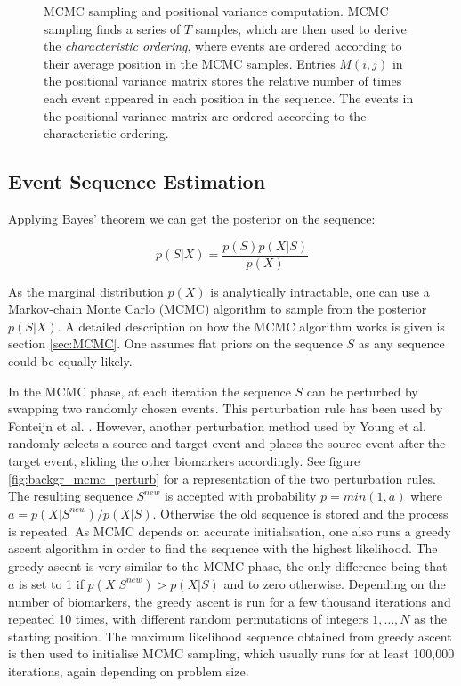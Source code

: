 \begin{figure}
\caption[Event-based model - MCMC sampling diagram]{MCMC sampling and positional variance computation. MCMC sampling finds a series of $T$ samples, which are then used to derive the \emph{characteristic ordering}, where events are ordered according to their average position in the MCMC samples. Entries $M(i,j)$ in the positional variance matrix stores the relative number of times each event appeared in each position in the sequence. The events in the positional variance matrix are ordered according to the characteristic ordering.}
\end{figure}


\subsection{Event Sequence Estimation}
\label{sec:model_est}

Applying Bayes' theorem  we can get the posterior on the sequence:

\begin{equation}
 p(S|X) = \frac{p(S)p(X|S)}{p(X)}
\end{equation}

As the marginal distribution $p(X)$ is analytically intractable, one can use a Markov-chain Monte Carlo (MCMC) algorithm to sample from the posterior $p(S|X)$. A detailed description on how the MCMC algorithm works is given is section \ref{sec:MCMC}. One assumes flat priors on the sequence $S$ as any sequence could be equally likely.

In the MCMC phase, at each iteration the sequence $S$ can be perturbed by swapping two randomly chosen events. This perturbation rule has been used by Fonteijn et al. \cite{fonteijn2012event}. However, another perturbation method used by Young et al. \cite{young2014data} randomly selects a source and target event and places the source event after the target event, sliding the other biomarkers accordingly. See figure \ref{fig:backgr_mcmc_perturb} for a representation of the two perturbation rules. The resulting sequence $S^{new}$ is accepted with probability $p = min(1, a)$ where $ a = p(X|S^{new})/p(X|S)$. Otherwise the old sequence is stored and the process is repeated. As MCMC depends on accurate initialisation, one also runs a greedy ascent algorithm in order to find the sequence with the highest likelihood. The greedy ascent is very similar to the MCMC phase, the only difference being that $a$ is set to 1 if $p(X|S^{new}) > p(X|S)$ and to zero otherwise. Depending on the number of biomarkers, the greedy ascent is run for a few thousand iterations and repeated 10 times, with different random permutations of integers $1,\dots,N$ as the starting position. The maximum likelihood sequence obtained from greedy ascent is then used to initialise MCMC sampling, which usually runs for at least 100,000 iterations, again depending on problem size.

